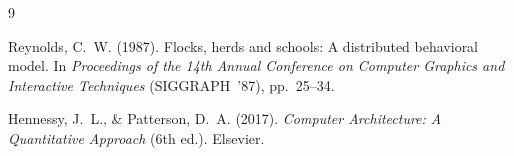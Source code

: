\documentclass[11pt,a4paper]{article}
\begin{document}
\begin{thebibliography}{9}

Reynolds, C.~W. (1987).
\newblock Flocks, herds and schools: A distributed behavioral model.
\newblock In \textit{Proceedings of the 14th Annual Conference on Computer Graphics and Interactive Techniques} (SIGGRAPH~'87), pp.~25--34.

Hennessy, J.~L., \& Patterson, D.~A. (2017).
\newblock \textit{Computer Architecture: A Quantitative Approach} (6th ed.).
\newblock Elsevier.

\end{thebibliography}
\end{document}
